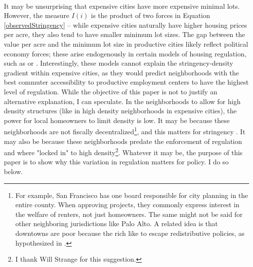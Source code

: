 \documentclass[]{article}
\begin{document}
	\paragraph*{}
	It may be unsurprising that expensive cities have more expensive minimal lots. However, the measure $I(i)$ is the product of two forces in Equation \eqref{observedStringency} -- while expensive cities naturally have higher housing prices per acre, they also tend to have smaller minimum lot sizes. The gap between the value per acre and the minimum lot size in productive cities likely reflect political economy forces; these arise endogenously in certain models of housing regulation, such as \cite{parkho} or \cite{HILBER2013}. Interestingly, these models cannot explain the stringency-density gradient within expensive cities, as they would predict neighborhoods with the best commuter accessibility to productive employment centers to have the highest level of regulation. While the objective of this paper is not to justify an alternative explanation, I can speculate. In the neighborhoods to allow for high density structures (like in high density neighborhoods in expensive cities), the power for local homeowners to limit density is low. It may be because these neighborhoods are not fiscally decentralized\footnote{For example, San Francisco has one board responsible for city planning in the entire county. When approving projects, they commonly express interest in the welfare of renters, not just homeowners. The same might not be said for other neighboring jurisdictions like Palo Alto. A related idea is that downtowns are poor because the rich like to escape redistributive policies, as hypothesized in \cite{NechybaWalsh}.}, and this matters for stringency \citep{ineffTiebout}. It may also be because these neighborhoods predate the enforcement of regulation and where "locked in" to high density\footnote{I thank Will Strange for this suggestion.}. Whatever it may be, the purpose of this paper is to show why this variation in regulation matters for policy. I do so below. 
	
	
\end{document}
